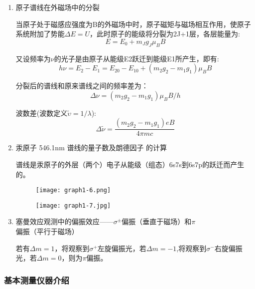 \documentclass[dvipsnames, svgnames,a4paper,11pt]{article}
\begin{document}
	\begin{enumerate}
		\item 原子谱线在外磁场中的分裂

			当原子处于磁感应强度为B的外磁场中时，原子磁矩与磁场相互作用，使原子系统附加了势能$\Delta E=U$，此时原子的能级将分裂为2J+1层，各层能量为:
			\[
				E = E_0 +m_J g_J \mu_B B
			\]

			又设频率为$\nu$的光子是由原子从能级E2跃迁到能级E1所产生，即有:
			\[
				h\nu = E_2 - E_1 = E_{20} - E_{10} + (m_2 g_2 -m_1 g_1)\mu_B B	
			\]

			分裂后的谱线和原来谱线之间的频率差为：
			\[
				\Delta \nu = (m_2 g_2 -m_1 g_1)\mu_B B / h
			\]

			波数差(波数定义$\widetilde{\upsilon}=1/\lambda$):
			\[
				\Delta \tilde{\nu} = \frac{(m_2 g_2 - m_1 g_1)eB}{4 \pi m c} 	
			\]

		\item 汞原子 546.1nm 谱线的量子数及朗德因子 的计算
		
			谱线是汞原子的外层（两个）电子从能级（组态）6s7s到6s7p的跃迁而产生的。 

				\begin{figure}[H]
					\centering
					\texttt{[image: graph1-6.png]}
					\label{fig:graph1-6}
				\end{figure}

				\begin{figure}[H]
					\centering
					\texttt{[image: graph1-7.jpg]}
					\label{fig:graph1-7}
				\end{figure}
			
		\item 塞曼效应观测中的偏振效应——$\sigma^\pm$偏振（垂直于磁场）和$\pi$偏振（平行于磁场）
		
			若有$\Delta m = 1$，将观察到$\sigma^+$左旋偏振光，若$\Delta m = -1$,将观察到$\sigma^-$右旋偏振光，若$\Delta m = 0$，则为$\pi$偏振。
	\end{enumerate}	





\subsubsection{基本测量仪器介绍}
\end{document}

